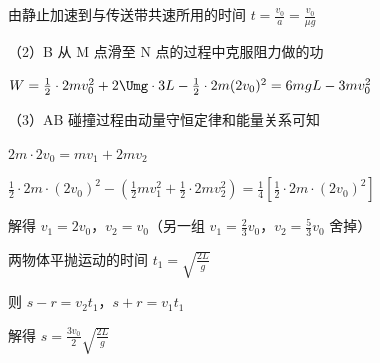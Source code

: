 \documentclass[\gkver]{gaokaozhenti}
\begin{document}
\begin{enumerate}
{由静止加速到与传送带共速所用的时间 $t = \frac{v_{0}}{a} = \frac{v_{0}}{\mu g}$

（2）B 从 M 点滑至 N 点的过程中克服阻力做的功

$W = \frac{1}{2} \cdot 2mv_{0}^{2} + 2\Umg \cdot 3L - \frac{1}{2} \cdot 2m(2v_{0})^{2} = 6mgL - 3mv_{0}^{2}$

（3）AB 碰撞过程由动量守恒定律和能量关系可知

$2m \cdot 2v_{0} = mv_{1} + 2mv_{2}$

$\frac{1}{2} \cdot 2m \cdot (2v_{0})^{2} - \left(\frac{1}{2}mv_{1}^{2} + \frac{1}{2} \cdot 2mv_{2}^{2}\right) = \frac{1}{4}\left[\frac{1}{2} \cdot 2m \cdot (2v_{0})^{2}\right]$

解得 $v_{1} = 2v_{0}$，$v_{2} = v_{0}$（另一组 $v_{1} = \frac{2}{3}v_{0}$，$v_{2} = \frac{5}{3}v_{0}$ 舍掉）

两物体平抛运动的时间 $t_{1} = \sqrt{\frac{2L}{g}}$

则 $s - r = v_{2}t_{1}$，$s + r = v_{1}t_{1}$

解得 $s = \frac{3v_{0}}{2}\sqrt{\frac{2L}{g}}$
}

\end{enumerate}
\end{document}
